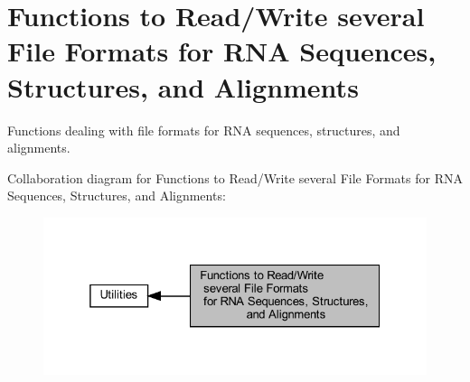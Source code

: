 \hypertarget{group__file__utils}{}\section{Functions to Read/\+Write several File Formats for R\+NA Sequences, Structures, and Alignments}
\label{group__file__utils}


Functions dealing with file formats for R\+NA sequences, structures, and alignments.  


Collaboration diagram for Functions to Read/\+Write several File Formats for R\+NA Sequences, Structures, and Alignments\+:
\nopagebreak
\begin{figure}[H]
\begin{center}
\leavevmode
\includegraphics[width=325pt]{group__file__utils}
\end{center}
\end{figure}
